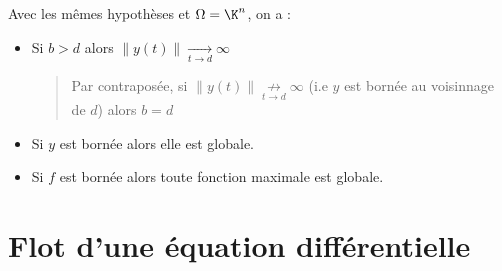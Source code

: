 \begin{theorem}[Explosion]
    Avec les mêmes hypothèses et $\Omega = \K^n$, on a : 
    \begin{itemize}
        \item Si $b > d$ alors $ \| y(t) \| \underset{t \to d}{\longrightarrow} \infty $ 
            \begin{quote}
                Par contraposée, si $ \| y(t) \| \underset{t \to d}{ \not \longrightarrow} \infty $ 
                (i.e $y$ est bornée au voisinnage de $d$) alors $b = d$
            \end{quote}
        \item Si $y$ est bornée alors elle est globale. 
        \item Si $f$ est bornée alors toute fonction maximale est globale. 
    \end{itemize}
\end{theorem}



\section{Flot d'une équation différentielle}

